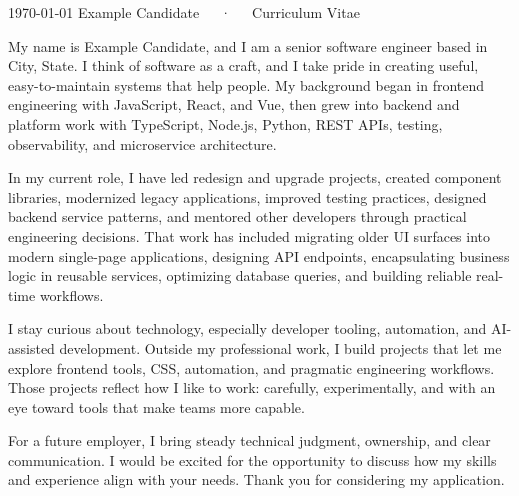 \documentclass[11pt, letterpaper]{../getkan-cv}
\begin{document}
\makeletterheader[C]

\makeletterfooter
{\today}
{Example Candidate~~~·~~~Curriculum Vitae}
{\thepage}


\makelettertitle

\begin{letterletter}
    My name is Example Candidate, and I am a senior software engineer based in City, State. I think of software as a craft, and I take pride in creating useful, easy-to-maintain systems that help people. My background began in frontend engineering with JavaScript, React, and Vue, then grew into backend and platform work with TypeScript, Node.js, Python, REST APIs, testing, observability, and microservice architecture.

    In my current role, I have led redesign and upgrade projects, created component libraries, modernized legacy applications, improved testing practices, designed backend service patterns, and mentored other developers through practical engineering decisions. That work has included migrating older UI surfaces into modern single-page applications, designing API endpoints, encapsulating business logic in reusable services, optimizing database queries, and building reliable real-time workflows.

    I stay curious about technology, especially developer tooling, automation, and AI-assisted development. Outside my professional work, I build projects that let me explore frontend tools, CSS, automation, and pragmatic engineering workflows. Those projects reflect how I like to work: carefully, experimentally, and with an eye toward tools that make teams more capable.

    For a future employer, I bring steady technical judgment, ownership, and clear communication. I would be excited for the opportunity to discuss how my skills and experience align with your needs. Thank you for considering my application.
\end{letterletter}

\makeletterclosing


\end{document}
